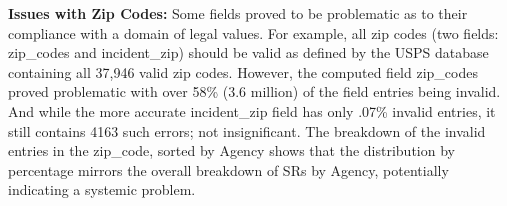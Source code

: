 \documentclass[linenumber]{jdsart}
\begin{document}

\label{sec:zipcodesissues}
 \textbf{Issues with Zip Codes:} Some fields proved to be problematic 
 as to their compliance with a domain of legal values. For example, all zip codes 
 (two fields: zip\_codes and incident\_zip) should be valid as defined 
 by the USPS database containing all 37,946 valid zip codes. However,
 the computed field zip\_codes proved problematic with over 
58\% (3.6 million) of the field entries being invalid. And while the more accurate 
incident\_zip field has only .07\% invalid entries, it still contains
4163 such errors; not insignificant. The breakdown of the invalid 
entries in the zip\_code, sorted by Agency shows that the 
distribution by percentage mirrors the overall breakdown of 
SRs by Agency, potentially indicating a systemic problem.
	
\end{document}
